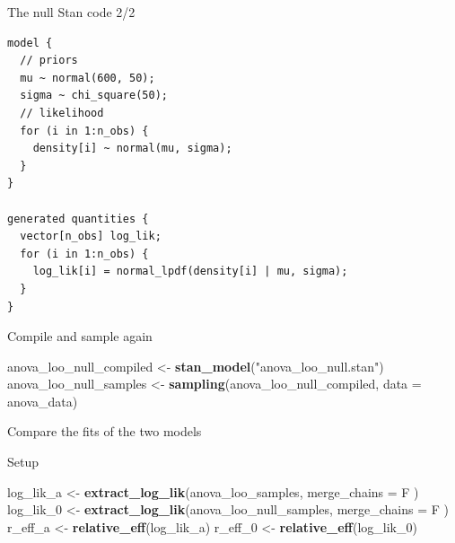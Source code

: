 \documentclass[
  ignorenonframetext,
]{beamer}
\newenvironment{Shaded}{\begin{snugshade}}{\end{snugshade}}
\newcommand{\DataTypeTok}[1]{\textcolor[rgb]{0.13,0.29,0.53}{#1}}
\newcommand{\DecValTok}[1]{\textcolor[rgb]{0.00,0.00,0.81}{#1}}
\newcommand{\KeywordTok}[1]{\textcolor[rgb]{0.13,0.29,0.53}{\textbf{#1}}}
\newcommand{\NormalTok}[1]{#1}
\newcommand{\StringTok}[1]{\textcolor[rgb]{0.31,0.60,0.02}{#1}}
\begin{document}
\begin{frame}[fragile]{The null Stan code 2/2}
\protect\hypertarget{the-null-stan-code-22}{}

\begin{verbatim}
model {
  // priors
  mu ~ normal(600, 50);
  sigma ~ chi_square(50);
  // likelihood
  for (i in 1:n_obs) {
    density[i] ~ normal(mu, sigma);
  }
}

generated quantities {
  vector[n_obs] log_lik;
  for (i in 1:n_obs) {
    log_lik[i] = normal_lpdf(density[i] | mu, sigma);
  }
}
\end{verbatim}

\end{frame}

\begin{frame}[fragile]{Compile and sample again}
\protect\hypertarget{compile-and-sample-again}{}

\begin{Shaded}
\begin{Highlighting}[]
\NormalTok{anova_loo_null_compiled <-}\StringTok{ }\KeywordTok{stan_model}\NormalTok{(}\StringTok{"anova_loo_null.stan"}\NormalTok{)}
\NormalTok{anova_loo_null_samples <-}\StringTok{ }\KeywordTok{sampling}\NormalTok{(anova_loo_null_compiled, }\DataTypeTok{data =}\NormalTok{ anova_data)}
\end{Highlighting}
\end{Shaded}

\end{frame}

\begin{frame}[fragile]{Compare the fits of the two models}
\protect\hypertarget{compare-the-fits-of-the-two-models}{}

Setup

\begin{Shaded}
\begin{Highlighting}[]
\NormalTok{log_lik_a <-}\StringTok{ }\KeywordTok{extract_log_lik}\NormalTok{(anova_loo_samples,}
  \DataTypeTok{merge_chains =}\NormalTok{ F}
\NormalTok{)}
\NormalTok{log_lik_}\DecValTok{0}\NormalTok{ <-}\StringTok{ }\KeywordTok{extract_log_lik}\NormalTok{(anova_loo_null_samples,}
  \DataTypeTok{merge_chains =}\NormalTok{ F}
\NormalTok{)}
\NormalTok{r_eff_a <-}\StringTok{ }\KeywordTok{relative_eff}\NormalTok{(log_lik_a)}
\NormalTok{r_eff_}\DecValTok{0}\NormalTok{ <-}\StringTok{ }\KeywordTok{relative_eff}\NormalTok{(log_lik_}\DecValTok{0}\NormalTok{)}
\end{Highlighting}
\end{Shaded}

\end{frame}
\end{document}
